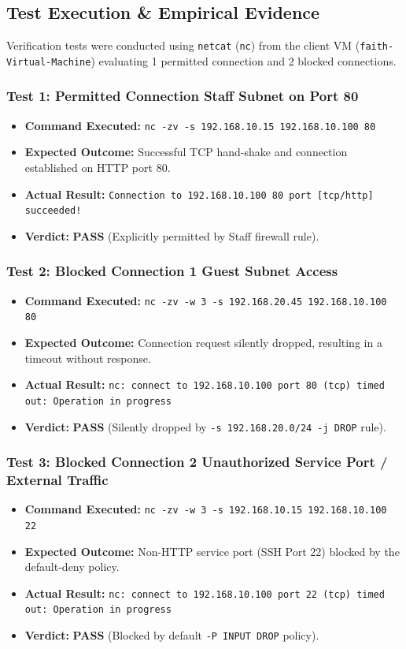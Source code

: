 \documentclass[11pt,a4paper]{article}
\begin{document}
\subsection{Test Execution \& Empirical Evidence}
Verification tests were conducted using \texttt{netcat} (\texttt{nc}) from the client VM (\texttt{faith-Virtual-Machine}) evaluating 1 permitted connection and 2 blocked connections.

\subsubsection{Test 1: Permitted Connection Staff Subnet on Port 80}
\begin{itemize}
    \item \textbf{Command Executed:} \texttt{nc -zv -s 192.168.10.15 192.168.10.100 80}
    \item \textbf{Expected Outcome:} Successful TCP hand-shake and connection established on HTTP port 80.
    \item \textbf{Actual Result:} \texttt{Connection to 192.168.10.100 80 port [tcp/http] succeeded!}
    \item \textbf{Verdict:} \textbf{PASS} (Explicitly permitted by Staff firewall rule).
\end{itemize}

\subsubsection{Test 2: Blocked Connection 1 Guest Subnet Access}
\begin{itemize}
    \item \textbf{Command Executed:} \texttt{nc -zv -w 3 -s 192.168.20.45 192.168.10.100 80}
    \item \textbf{Expected Outcome:} Connection request silently dropped, resulting in a timeout without response.
    \item \textbf{Actual Result:} \texttt{nc: connect to 192.168.10.100 port 80 (tcp) timed out: Operation in progress}
    \item \textbf{Verdict:} \textbf{PASS} (Silently dropped by \texttt{-s 192.168.20.0/24 -j DROP} rule).
\end{itemize}

\subsubsection{Test 3: Blocked Connection 2 Unauthorized Service Port / External Traffic}
\begin{itemize}
    \item \textbf{Command Executed:} \texttt{nc -zv -w 3 -s 192.168.10.15 192.168.10.100 22}
    \item \textbf{Expected Outcome:} Non-HTTP service port (SSH Port 22) blocked by the default-deny policy.
    \item \textbf{Actual Result:} \texttt{nc: connect to 192.168.10.100 port 22 (tcp) timed out: Operation in progress}
    \item \textbf{Verdict:} \textbf{PASS} (Blocked by default \texttt{-P INPUT DROP} policy).
\end{itemize}
\end{document}
